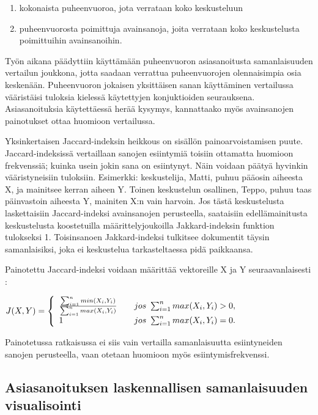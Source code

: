 \documentclass[11pt,a4paper,oneside]{memoir}
\begin{document}
\begin{enumerate}
\item kokonaista puheenvuoroa, jota verrataan koko keskusteluun
\item puheenvuorosta poimittuja avainsanoja, joita verrataan koko keskustelusta poimittuihin avainsanoihin.
\end{enumerate}

Työn aikana päädyttiin käyttämään puheenvuoron asiasanoitusta samanlaisuuden vertailun joukkona, jotta saadaan verrattua puheenvuorojen olennaisimpia osia keskenään. Puheenvuoron jokaisen yksittäisen sanan käyttäminen vertailussa vääristäisi tuloksia kielessä käytettyjen konjuktioiden seurauksena. Asiasanoituksia käytettäessä herää kysymys, kannattaako myös avainsanojen painotukset ottaa huomioon vertailussa.

Yksinkertaisen Jaccard-indeksin heikkous on sisällön painoarvoistamisen puute. Jaccard-indeksissä vertaillaan sanojen esiintymiä toisiin ottamatta huomioon frekvenssiä; kuinka usein jokin sana on esiintynyt. Näin voidaan päätyä hyvinkin vääristyneisiin tuloksiin. Esimerkki: keskustelija, Matti, puhuu pääosin aiheesta X, ja mainitsee kerran aiheen Y. Toinen keskustelun osallinen, Teppo, puhuu taas päinvastoin aiheesta Y, mainiten X:n vain harvoin. Jos tästä keskustelusta laskettaisiin Jaccard-indeksi avainsanojen perusteella, saataisiin edellämainitusta keskustelusta koostetuilla määrittelyjoukoilla Jakkard-indeksin funktion tulokseksi 1. Toisinsanoen Jakkard-indeksi tulkitsee dokumentit täysin samanlaisiksi, joka ei keskustelua tarkasteltaessa pidä paikkaansa.

Painotettu Jaccard-indeksi voidaan määrittää vektoreille X ja Y seuraavanlaisesti \cite[s. 2]{finding-the-jaccard-median}:

\begin{math}
  J(X, Y) = \left\{ 
  \begin{array}{l l}
	\frac{\sum^n_{i=1} min(X_i, Y_i)}{\sum^n_{i=1} max(X_i, Y_i)} & \quad \text{$jos$ } \sum^n_{i=1} max(X_i, Y_i) > 0,\\
	1 & \quad \text{$jos$ } \sum^n_{i=1} max(X_i, Y_i) = 0.\\	
  \end{array} \right.
\end{math}

Painotetussa ratkaisussa ei siis vain vertailla samanlaisuutta esiintyneiden sanojen perusteella, vaan otetaan huomioon myös esiintymisfrekvenssi.

\subsection{Asiasanoituksen laskennallisen samanlaisuuden visualisointi}
\end{document}
